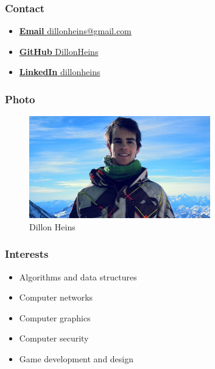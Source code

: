 \documentclass{article}
\begin{document}
\subsubsection{Contact}
\begin{itemize}
	\item \href{mailto:dillonheins@gmail.com}{\textbf{Email} dillonheins@gmail.com}
	\item \href{https://github.com/DillonHeins}{\textbf{GitHub} DillonHeins}
	\item \href{https://za.linkedin.com/in/dillon-heins-54275810}{\textbf{LinkedIn} dillonheins}
\end{itemize}
\subsubsection{Photo}
\begin{figure}[H]
	\centering
	\includegraphics[width=0.7\textwidth]{../dillon.jpg}
	\caption{Dillon Heins}
\end{figure}
\subsubsection{Interests}
\begin{itemize}
	\item Algorithms and data structures
	\item Computer networks
	\item Computer graphics
	\item Computer security
	\item Game development and design
\end{itemize}
\end{document}
